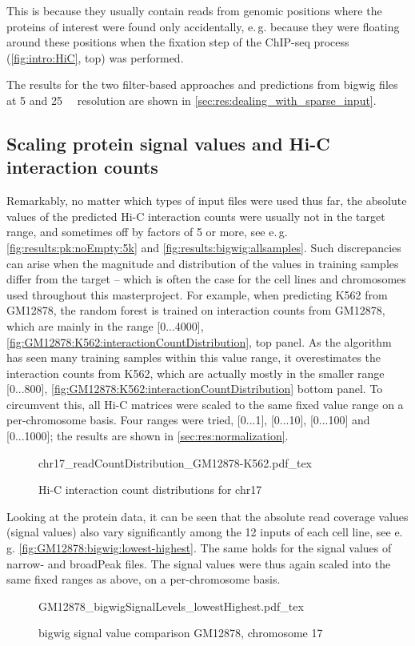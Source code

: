 This is because they usually contain reads from genomic positions where the proteins of interest
were found only accidentally, 
e.\,g. because they were floating around these positions when the fixation step of the ChIP-seq process
(\autoref{fig:intro:HiC}, top) was performed.

The results for the two filter-based approaches and predictions from bigwig files at 5 and \SI{25}{\kilo\bp} resolution 
are shown in \autoref{sec:res:dealing_with_sparse_input}.

\subsection{Scaling protein signal values and Hi-C interaction counts}
Remarkably, no matter which types of input files were used thus far, 
the absolute values of the predicted Hi-C interaction counts were usually not in the target range, 
and sometimes off by factors of 5 or more, see e.\,g. \autoref{fig:results:pk:noEmpty:5k} and \ref{fig:results:bigwig:allsamples}. 
Such discrepancies can arise when the magnitude and distribution of the values in training samples differ from 
the target -- which is often the case for the cell lines and chromosomes used throughout this masterproject.
For example, when predicting K562 from GM12878, 
the random forest is trained on interaction counts from GM12878, 
which are mainly in the range [0...4000], \autoref{fig:GM12878:K562:interactionCountDistribution}, top panel.
As the algorithm has seen many training samples within this value range,
it overestimates the interaction counts from K562, 
which are actually mostly in the smaller range [0...800],
\autoref{fig:GM12878:K562:interactionCountDistribution} bottom panel.
To circumvent this, all Hi-C matrices were scaled to the same fixed value range on a per-chromosome basis.
Four ranges were tried, [0...1], [0...10], [0...100] and [0...1000]; the results are shown in \autoref{sec:res:normalization}.
\begin{figure}
 \small
 \centering
 {chr17_readCountDistribution_GM12878-K562.pdf_tex}
 \caption{Hi-C interaction count distributions for chr17}
 \label{fig:GM12878:K562:interactionCountDistribution}
\end{figure}

Looking at the protein data, it can be seen that the absolute read coverage values (signal values)
also vary significantly among the 12 inputs of each cell line, see e.\,g. \autoref{fig:GM12878:bigwig:lowest-highest}.
The same holds for the signal values of narrow- and broadPeak files.
The signal values were thus again scaled into the same fixed ranges as above, on a per-chromosome basis.
\begin{figure}
 \scriptsize
 \centering
 {GM12878_bigwigSignalLevels_lowestHighest.pdf_tex}
 \caption{bigwig signal value comparison GM12878, chromosome 17}
 \label{fig:GM12878:bigwig:lowest-highest}
\end{figure}

